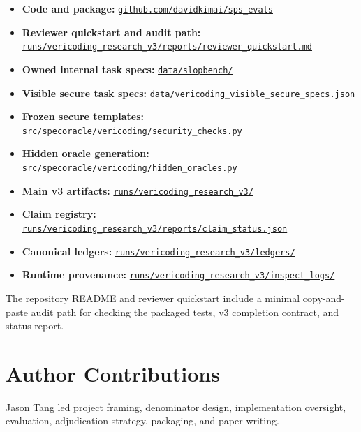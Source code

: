 \documentclass[11pt]{article}
\newcommand{\repoblob}[2]{\href{https://github.com/davidkimai/sps_evals/blob/main/#1}{\texttt{#2}}}
\newcommand{\repotree}[2]{\href{https://github.com/davidkimai/sps_evals/tree/main/#1}{\texttt{#2}}}
\begin{document}
\begin{itemize}[label={-}]
  \item \textbf{Code and package:} \href{https://github.com/davidkimai/sps_evals}{\texttt{github.com/davidkimai/sps\_evals}}
  \item \textbf{Reviewer quickstart and audit path:} \repoblob{runs/vericoding_research_v3/reports/reviewer_quickstart.md}{runs/vericoding\_research\_v3/reports/reviewer\_quickstart.md}
  \item \textbf{Owned internal task specs:} \repotree{data/slopbench}{data/slopbench/}
  \item \textbf{Visible secure task specs:} \repoblob{data/vericoding_visible_secure_specs.json}{data/vericoding\_visible\_secure\_specs.json}
  \item \textbf{Frozen secure templates:} \repoblob{src/specoracle/vericoding/security_checks.py}{src/specoracle/vericoding/security\_checks.py}
  \item \textbf{Hidden oracle generation:} \repoblob{src/specoracle/vericoding/hidden_oracles.py}{src/specoracle/vericoding/hidden\_oracles.py}
  \item \textbf{Main v3 artifacts:} \repotree{runs/vericoding_research_v3}{runs/vericoding\_research\_v3/}
  \item \textbf{Claim registry:} \repoblob{runs/vericoding_research_v3/reports/claim_status.json}{runs/vericoding\_research\_v3/reports/claim\_status.json}
  \item \textbf{Canonical ledgers:} \repotree{runs/vericoding_research_v3/ledgers}{runs/vericoding\_research\_v3/ledgers/}
  \item \textbf{Runtime provenance:} \repotree{runs/vericoding_research_v3/inspect_logs}{runs/vericoding\_research\_v3/inspect\_logs/}
\end{itemize}

The repository README and reviewer quickstart include a minimal copy-and-paste audit path for checking the packaged tests, v3 completion contract, and status report.

\section*{Author Contributions}

Jason Tang led project framing, denominator design, implementation oversight,
evaluation, adjudication strategy, packaging, and paper writing.
\end{document}
